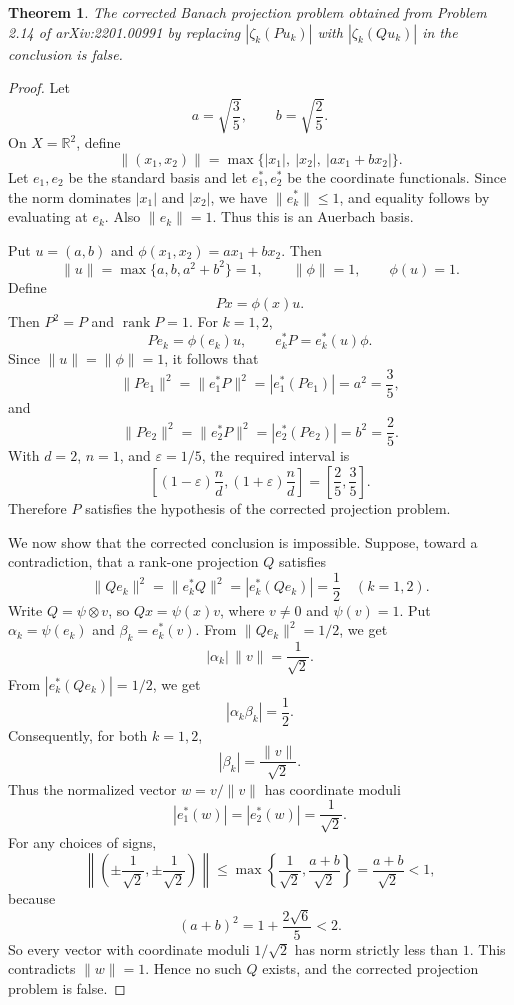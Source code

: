 \documentclass[11pt]{article}
\newtheorem{theorem}{Theorem}
\begin{document}
\begin{theorem}
The corrected Banach projection problem obtained from Problem 2.14 of
arXiv:2201.00991 by replacing \(|\zeta_k(Pu_k)|\) with
\(|\zeta_k(Qu_k)|\) in the conclusion is false.
\end{theorem}

\begin{proof}
Let
\[
a=\sqrt{\frac35},\qquad b=\sqrt{\frac25}.
\]
On \(X=\mathbb R^2\), define
\[
\|(x_1,x_2)\|=\max\{|x_1|,\ |x_2|,\ |a x_1+b x_2|\}.
\]
Let \(e_1,e_2\) be the standard basis and let \(e_1^*,e_2^*\) be the
coordinate functionals.  Since the norm dominates \(|x_1|\) and \(|x_2|\),
we have \(\|e_k^*\|\leq1\), and equality follows by evaluating at \(e_k\).
Also \(\|e_k\|=1\).  Thus this is an Auerbach basis.

Put \(u=(a,b)\) and \(\phi(x_1,x_2)=a x_1+b x_2\).  Then
\[
\|u\|=\max\{a,b,a^2+b^2\}=1,\qquad \|\phi\|=1,\qquad \phi(u)=1.
\]
Define
\[
P x=\phi(x)u.
\]
Then \(P^2=P\) and \(\operatorname{rank}P=1\).  For \(k=1,2\),
\[
Pe_k=\phi(e_k)u,\qquad e_k^*P=e_k^*(u)\phi.
\]
Since \(\|u\|=\|\phi\|=1\), it follows that
\[
\|Pe_1\|^2=\|e_1^*P\|^2=|e_1^*(Pe_1)|=a^2=\frac35,
\]
and
\[
\|Pe_2\|^2=\|e_2^*P\|^2=|e_2^*(Pe_2)|=b^2=\frac25.
\]
With \(d=2\), \(n=1\), and \(\varepsilon=1/5\), the required interval is
\[
\left[(1-\varepsilon)\frac nd,(1+\varepsilon)\frac nd\right]
=\left[\frac25,\frac35\right].
\]
Therefore \(P\) satisfies the hypothesis of the corrected projection problem.

We now show that the corrected conclusion is impossible.  Suppose, toward a
contradiction, that a rank-one projection \(Q\) satisfies
\[
\|Qe_k\|^2=\|e_k^*Q\|^2=|e_k^*(Qe_k)|=\frac12
\quad (k=1,2).
\]
Write \(Q=\psi\otimes v\), so \(Qx=\psi(x)v\), where \(v\neq0\) and
\(\psi(v)=1\).  Put \(\alpha_k=\psi(e_k)\) and \(\beta_k=e_k^*(v)\).  From
\(\|Qe_k\|^2=1/2\), we get
\[
|\alpha_k|\,\|v\|=\frac1{\sqrt2}.
\]
From \(|e_k^*(Qe_k)|=1/2\), we get
\[
|\alpha_k\beta_k|=\frac12.
\]
Consequently, for both \(k=1,2\),
\[
|\beta_k|=\frac{\|v\|}{\sqrt2}.
\]
Thus the normalized vector \(w=v/\|v\|\) has coordinate moduli
\[
|e_1^*(w)|=|e_2^*(w)|=\frac1{\sqrt2}.
\]
For any choices of signs,
\[
\left\|\left(\pm\frac1{\sqrt2},\pm\frac1{\sqrt2}\right)\right\|
\leq \max\left\{\frac1{\sqrt2},\frac{a+b}{\sqrt2}\right\}
=\frac{a+b}{\sqrt2}<1,
\]
because
\[
(a+b)^2=1+\frac{2\sqrt6}{5}<2.
\]
So every vector with coordinate moduli \(1/\sqrt2\) has norm strictly less
than \(1\).  This contradicts \(\|w\|=1\).  Hence no such \(Q\) exists, and
the corrected projection problem is false.
\end{proof}
\end{document}
